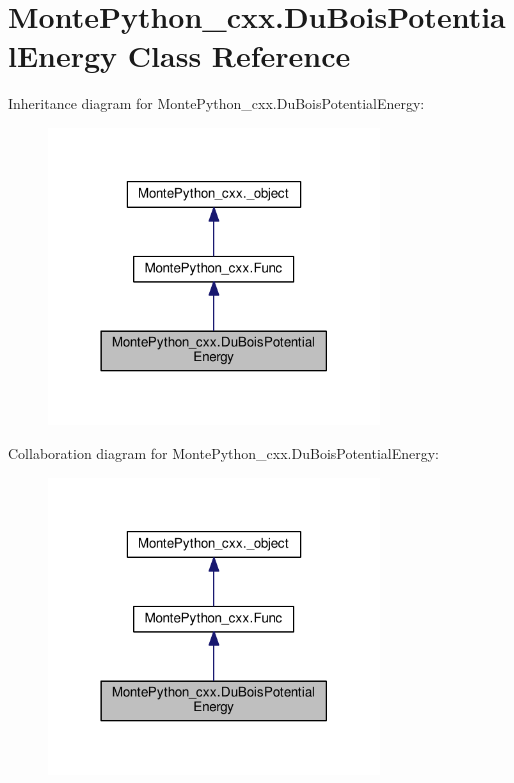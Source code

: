 \hypertarget{classMontePython__cxx_1_1DuBoisPotentialEnergy}{}\section{Monte\+Python\+\_\+cxx.\+Du\+Bois\+Potential\+Energy Class Reference}
\label{classMontePython__cxx_1_1DuBoisPotentialEnergy}


Inheritance diagram for Monte\+Python\+\_\+cxx.\+Du\+Bois\+Potential\+Energy\+:
\nopagebreak
\begin{figure}[H]
\begin{center}
\leavevmode
\includegraphics[width=249pt]{classMontePython__cxx_1_1DuBoisPotentialEnergy__inherit__graph}
\end{center}
\end{figure}


Collaboration diagram for Monte\+Python\+\_\+cxx.\+Du\+Bois\+Potential\+Energy\+:
\nopagebreak
\begin{figure}[H]
\begin{center}
\leavevmode
\includegraphics[width=249pt]{classMontePython__cxx_1_1DuBoisPotentialEnergy__coll__graph}
\end{center}
\end{figure}
